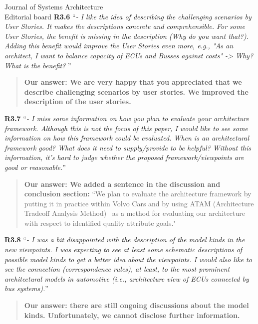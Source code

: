 \documentclass[a4paper,10pt]{letter}
\begin{document}
\begin{letter}{Journal of Systems Architecture\\
    Editorial board}
\textbf{R3.6} ``\textit{- I like the idea of describing the challenging scenarios by User Stories. It makes the descriptions concrete and comprehensible. For some User Stories, the benefit is missing in the description (Why do you want that?). Adding this benefit would improve the User Stories even more, e.g., "As an architect, I want to balance capacity of ECUs and Busses against costs" -> Why? What is the benefit? }''
\begin{quote}
\textbf{Our answer: We are very happy that you appreciated that we describe challenging scenarios by user stories. We improved the description of the user stories.} 
\end{quote}

\textbf{R3.7} ``\textit{- I miss some information on how you plan to evaluate your architecture framework. Although this is not the focus of this paper, I would like to see some information on how this framework could be evaluated. When is an architectural framework good? What does it need to supply/provide to be helpful? Without this information, it's hard to judge whether the proposed framework/viewpoints are good or reasonable.}''
\begin{quote}
\textbf{Our answer: We added a sentence in the discussion and conclusion section:} ``We plan to evaluate the architecture framework by putting it in practice within Volvo Cars and by using ATAM (Architecture Tradeoff Analysis Method)~\cite{ATAM} as a method for evaluating our architecture with respect to identified quality attribute goals." 
\end{quote}

\textbf{R3.8} ``\textit{- I was a bit disappointed with the description of the model kinds in the new viewpoints. I was expecting to see at least some schematic descriptions of possible model kinds to get a better idea about the viewpoints. I would also like to see the connection (correspondence rules), at least, to the most prominent architectural models in automotive (i.e., architecture view of ECUs connected by bus systems).}''
\begin{quote}
\textbf{Our answer: there are still ongoing discussions about the model kinds. Unfortunately, we cannot disclose further information.}
\end{quote}


\end{letter}
\end{document}
